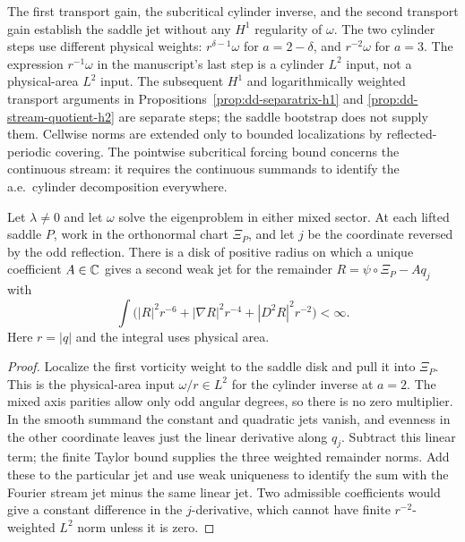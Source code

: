 \begin{remark}
The first transport gain, the subcritical cylinder inverse, and the second
transport gain establish the saddle jet without any $H^1$ regularity of
$\omega$. The two cylinder steps use different physical weights:
$r^{\delta-1}\omega$ for $a=2-\delta$, and $r^{-2}\omega$ for $a=3$.
The expression $r^{-1}\omega$ in the manuscript's last step is a cylinder
$L^2$ input, not a physical-area $L^2$ input.
The subsequent $H^1$ and logarithmically weighted transport arguments in
Propositions~\ref{prop:dd-separatrix-h1} and
\ref{prop:dd-stream-quotient-h2} are separate steps; the saddle bootstrap
does not supply them. Cellwise norms are extended only to bounded
localizations by reflected-periodic covering. The pointwise subcritical
forcing bound concerns the continuous stream: it requires the continuous
summands to identify the a.e.\ cylinder decomposition everywhere.
\end{remark}

\begin{corollary}
\label{cor:mixed-saddle-jet}
\leanok
Let $\lambda\ne0$ and let $\omega$ solve the eigenproblem in either mixed
sector. At each lifted saddle $P$, work in the orthonormal chart $\Xi_P$,
and let $j$ be the coordinate reversed by the odd reflection. There is a
disk of positive radius on which a unique coefficient $A\in\mathbb{C}$ gives a
second weak jet for the remainder $R=\psi\circ\Xi_P-Aq_j$ with
\[
  \int\bigl(|R|^2r^{-6}+|\nabla R|^2r^{-4}+|D^2R|^2r^{-2}\bigr)<\infty.
\]
Here $r=|q|$ and the integral uses physical area.
\end{corollary}

\begin{proof}
\leanok
Localize the first vorticity weight to the saddle disk and pull it into
$\Xi_P$. This is the physical-area input $\omega/r\in L^2$ for the cylinder
inverse at $a=2$. The mixed axis parities allow only odd angular degrees,
so there is no zero multiplier. In the smooth summand the constant and
quadratic jets vanish, and evenness in the other coordinate leaves just
the linear derivative along $q_j$. Subtract this linear term; the finite
Taylor bound supplies the three weighted remainder norms. Add these to the
particular jet and use weak uniqueness to identify the sum with the Fourier
stream jet minus the same linear jet. Two admissible coefficients would give
a constant difference in the $j$-derivative, which cannot have finite
$r^{-2}$-weighted $L^2$ norm unless it is zero.
\end{proof}


